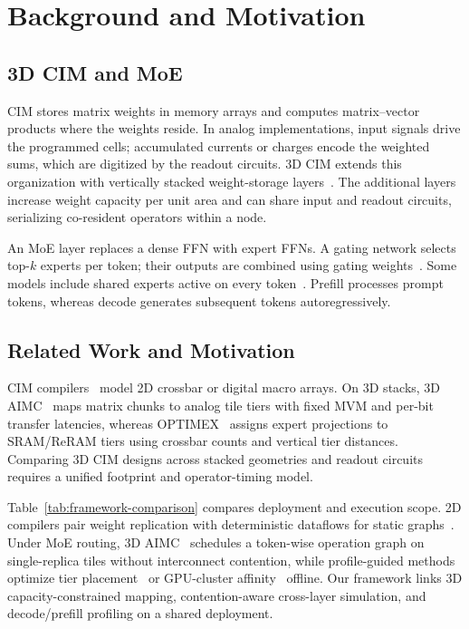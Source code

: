 \section{Background and Motivation}
\label{sec:background}

\subsection{3D CIM and MoE}

CIM stores matrix weights in memory arrays and computes matrix--vector products where the weights reside. In analog implementations, input signals drive the programmed cells; accumulated currents or charges encode the weighted sums, which are digitized by the readout circuits. 3D CIM extends this organization with vertically stacked weight-storage layers~\cite{lee2022,jang2025,buchel2025}. The additional layers increase weight capacity per unit area and can share input and readout circuits, serializing co-resident operators within a node.

An MoE layer replaces a dense FFN with expert FFNs. A gating network selects top-$k$ experts per token; their outputs are combined using gating weights~\cite{switch2022}. Some models include shared experts active on every token~\cite{deepseekmoe2024}. Prefill processes prompt tokens, whereas decode generates subsequent tokens autoregressively.

\subsection{Related Work and Motivation}

CIM compilers~\cite{pimcomp2023,cimmlc2024,cimflow2025} model 2D crossbar or digital macro arrays. On 3D stacks, 3D AIMC~\cite{buchel2025} maps matrix chunks to analog tile tiers with fixed MVM and per-bit transfer latencies, whereas OPTIMEX~\cite{sharma2025} assigns expert projections to SRAM/ReRAM tiers using crossbar counts and vertical tier distances. Comparing 3D CIM designs across stacked geometries and readout circuits requires a unified footprint and operator-timing model.



Table~\ref{tab:framework-comparison} compares deployment and execution scope. 2D compilers pair weight replication with deterministic dataflows for static graphs~\cite{pimcomp2023,cimmlc2024,cimflow2025}. Under MoE routing, 3D AIMC~\cite{buchel2025} schedules a token-wise operation graph on single-replica tiles without interconnect contention, while profile-guided methods optimize tier placement~\cite{sharma2025} or GPU-cluster affinity~\cite{exflow2024} offline. Our framework links 3D capacity-constrained mapping, contention-aware cross-layer simulation, and decode/prefill profiling on a shared deployment.


